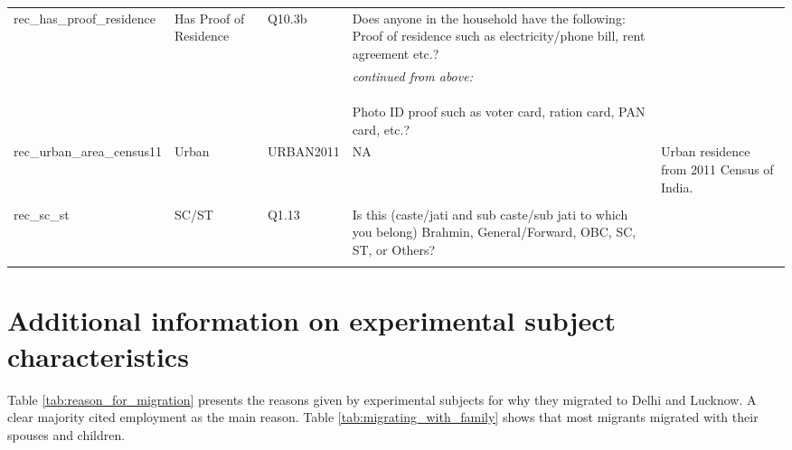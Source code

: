 \documentclass[
  11.5pt,
]{article}
\begin{document}
{\begin{landscape}
\begin{longtable}[t]{>{\raggedright\arraybackslash}p{16em}>{\raggedright\arraybackslash}p{6em}>{\raggedright\arraybackslash}p{7em}>{\raggedright\arraybackslash}p{18em}>{\raggedright\arraybackslash}p{18em}}
rec\_has\_proof\_residence & Has Proof of Residence & Q10.3b & Does anyone in the household have the following: \newline \newline Proof of residence such as electricity/phone bill, rent agreement etc.? & \\
\cellcolor{gray!6}{rec\_has\_photo\_id} & \cellcolor{gray!6}{Has Photo ID} & \cellcolor{gray!6}{Q10.3a} & \cellcolor{gray!6}{\textit{continued from above:} \newline \newline Photo ID proof such as voter card, ration card, PAN card, etc.?} & \cellcolor{gray!6}{}\\
rec\_urban\_area\_census11 & Urban & URBAN2011 & NA & Urban residence from 2011 Census of India.\\
\cellcolor{gray!6}{rec\_muslim} & \cellcolor{gray!6}{Muslim} & \cellcolor{gray!6}{Q1.11} & \cellcolor{gray!6}{What is the religion of the head of household?} & \cellcolor{gray!6}{}\\
rec\_sc\_st & SC/ST & Q1.13 & Is this (caste/jati and sub caste/sub jati to which you belong) Brahmin, General/Forward, OBC, SC, ST, or Others? & \\
\cellcolor{gray!6}{rec\_assets} & \cellcolor{gray!6}{Asset Index} & \cellcolor{gray!6}{ASSETS} & \cellcolor{gray!6}{I would like to ask you about what things your household owns. Do you own a … [various household items listed].} & \cellcolor{gray!6}{This variable is in the codebook, not in the questionnaire. The variable is made up of multiple questions from section 15 of the questionnaire.}\\*
\end{longtable}
\endgroup{}

\end{landscape}

}

\clearpage

\section{Additional information on experimental subject characteristics}

Table \ref{tab:reason_for_migration} presents the reasons given by
experimental subjects for why they migrated to Delhi and Lucknow. A
clear majority cited employment as the main reason. Table
\ref{tab:migrating_with_family} shows that most migrants migrated with
their spouses and children.
\end{document}
